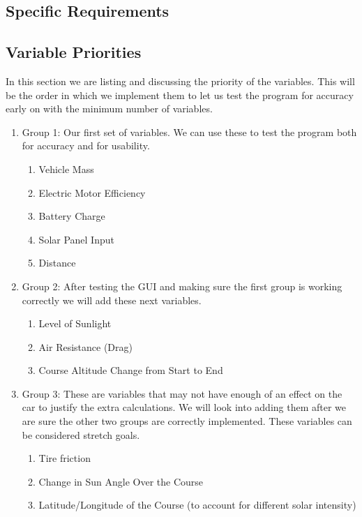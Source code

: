 \documentclass[onecolumn, draftclsnofoot,10pt, compsoc]{IEEEtran}
\begin{document}
\begin{singlespace}
\section{Specific Requirements}

    \subsection{Variable Priorities}
    In this section we are listing and discussing the priority of the variables. This will be the order in which we implement them to let us test the program for accuracy early on with the minimum number of variables.
    \begin{enumerate}
        \item Group 1: Our first set of variables. We can use these to test the program both for accuracy and for usability.
        \begin{enumerate}
            \item Vehicle Mass
            \item Electric Motor Efficiency
            \item Battery Charge
            \item Solar Panel Input
            \item Distance
        \end{enumerate}
        \item Group 2: After testing the GUI and making sure the first group is working correctly we will add these next variables.
        \begin{enumerate}
            \item Level of Sunlight
            \item Air Resistance (Drag)
            \item Course Altitude Change from Start to End
        \end{enumerate}
        \item Group 3: These are variables that may not have enough of an effect on the car to justify the extra calculations. We will look into adding them after we are sure the other two groups are correctly implemented. These variables can be considered stretch goals.
        \begin{enumerate}
            \item Tire friction
            \item Change in Sun Angle Over the Course
            \item Latitude/Longitude of the Course (to account for different solar intensity)
        \end{enumerate}
    \end{enumerate}
    

\end{singlespace}
\end{document}

